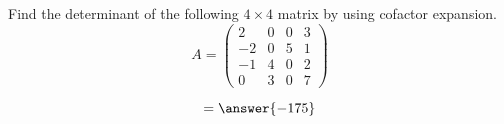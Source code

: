 \documentclass{ximera}
\author{Parisa Fatheddin}
\begin{document}
\begin{exercise}


Find the determinant of the following $4\times4$ matrix by using cofactor expansion.
\[
A = \begin{pmatrix}
2 & 0 & 0 & 3\\
-2 & 0 & 5 & 1\\
-1 & 4 & 0 & 2\\
0 & 3 & 0 & 7
\end{pmatrix}
\]

\begin{prompt}
\[
= \answer{-175}
\]
\end{prompt}








\end{exercise}
\end{document}
